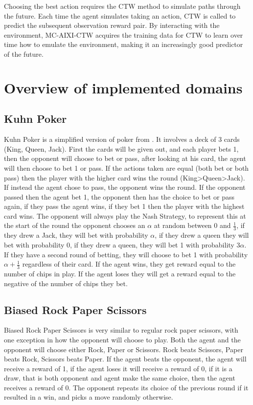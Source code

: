 \documentclass{article}
\theoremstyle{definition}
\newtheorem{primary statistics}[definition]{Primary Statistics}
\newtheorem{auxiliary statistics}[definition]{Auxiliary Statistics}
\begin{document}
Choosing the best action requires the CTW method to simulate paths through the future. Each time the agent simulates taking an action, CTW is called to predict the subsequent observation reward pair. By interacting with the environment, MC-AIXI-CTW acquires the training data for CTW to learn over time how to emulate the environment, making it an increasingly good predictor of the future.


\section{Overview of implemented domains}
\subsection{Kuhn Poker}
Kuhn Poker is a simplified version of poker from \citep{kuhn1950simplified}. It involves a deck of 3 cards (King, Queen, Jack). First the cards will be given out, and each player bets 1, then the opponent will choose to bet or pass, after looking at his card, the agent will then choose to bet 1 or pass. If the actions taken are equal (both bet or both pass) then the player with the higher card wins the round (King>Queen>Jack). If instead the agent chose to pass, the opponent wins the round. If the opponent passed then the agent bet 1, the opponent then has the choice to bet or pass again, if they pass the agent wins, if they bet 1 then the player with the highest card wins. The opponent will always play the Nash Strategy, to represent this at the start of the round the opponent chooses an $\alpha$ at random between 0 and $\frac{1}{3}$, if they drew a Jack, they will bet with probability $\alpha$, if they drew a queen they will bet with probability 0, if they drew a queen, they will bet 1 with probability $3\alpha$. If they have a second round of betting, they will choose to bet 1 with probability $\alpha+\frac{1}{3}$ regardless of their card. If the agent wins, they get reward equal to the number of chips in play. If the agent loses they will get a reward equal to the negative of the number of chips they bet.


\subsection{Biased Rock Paper Scissors}
Biased Rock Paper Scissors is very similar to regular rock paper scissors, with one exception in how the opponent will choose to play. Both the agent and the opponent will choose either Rock, Paper or Scissors. Rock beats Scissors, Paper beats Rock, Scissors beats Paper. If the agent beats the opponent, the agent will receive a reward of 1, if the agent loses it will receive a reward of 0, if it is a draw, that is both opponent and agent make the same choice, then the agent receives a reward of 0. The opponent repeats its choice of the previous round if it resulted in a win, and picks a move randomly otherwise. 
\end{document}
